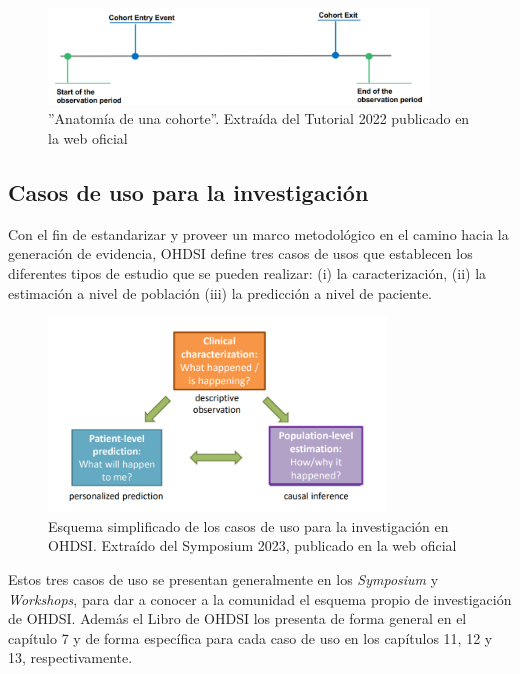 \begin{figure}[H]
\centering
\includegraphics[width=0.90\textwidth]{figures/cohortAnatomy.png}
     \caption{''Anatomía de una cohorte''. Extraída del Tutorial 2022 publicado en la web oficial \cite{OHDSIwebsite}}
    \label{fig:cohortAnatomy}
\end{figure}


\subsection{Casos de uso para la investigación} \label{subsec:05casosUso}

Con el fin de estandarizar y proveer un marco metodológico en el camino hacia la generación de evidencia, OHDSI define tres casos de usos que establecen los diferentes tipos de estudio que se pueden realizar: (i) la caracterización, (ii) la estimación a nivel de población (iii) la predicción a nivel de paciente.

\begin{figure}[H]
\centering
\includegraphics[width=0.80\textwidth]{figures/useCases.png}
     \caption{Esquema simplificado de los casos de uso para la investigación en OHDSI. Extraído del Symposium 2023, publicado en la web oficial \cite{OHDSIwebsite}}
    \label{fig:useCases}
\end{figure}

Estos tres casos de uso se presentan generalmente en los \textit{Symposium} y \textit{Workshops}, para dar a conocer a la comunidad el esquema propio de investigación de OHDSI. Además el Libro de OHDSI \cite{OHDSIbook} los presenta de forma general en el capítulo 7 y de forma específica para cada caso de uso en los capítulos 11, 12 y 13, respectivamente. 

